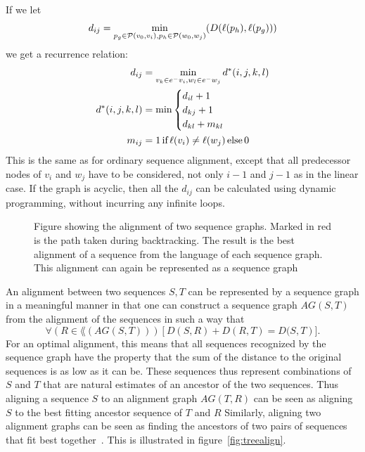 If we let 
\[
  d_{ij} = \min_{p_g \in \paths(v_0, v_i), p_h \in \paths(w_0, w_j)}(D(\slabel(p_h), \slabel(p_g)))
\]  we get a recurrence relation:
\begin{align*}
  d_{ij} &= \min_{v_k \in \preds{v_i}, w_l \in \preds{w_j}} d^*(i, j, k, l)\\
  d^*(i, j, k, l) &= \min \begin{cases}
    d_{il} + 1\\
    d_{kj} + 1\\
    d_{kl} + m_{kl}\\
    \end{cases}    
    \\
    m_{ij} &= 1\, \text{if}\, \slabel(v_i) \neq \slabel(w_j)\, \text{else}\, 0\\
\end{align*}
This is the same as for ordinary sequence alignment, except that all predecessor nodes of $v_i$ and $w_j$ have to be considered, not only $i-1$ and $j-1$ as in the linear case.
If the graph is acyclic, then all the $d_{ij}$ can be calculated using dynamic programming, without incurring any infinite loops.
\begin{figure}
  \begin{tikzpicture}
    
  \end{tikzpicture}
  \caption{
    Figure showing the alignment of two sequence graphs.
    Marked in red is the path taken during backtracking.
    The result is the best alignment of a sequence from the language of each sequence graph.
    This alignment can again be represented as a sequence graph}
    \label{fig:seqgrapha}
\end{figure}

An alignment between two sequences $S, T$ can be represented by a sequence graph in a meaningful manner in that one can construct a sequence graph $AG(S, T)$ from the alignment of the sequences in such a way that 
\[
\forall (R \in \lang(AG(S, T)))\left[D(S, R)+D(R, T) =  D(S, T\right)].
\]
For an optimal alignment, this means that all sequences recognized by the sequence graph have the property that the sum of the distance to the original sequences is as low as it can be.
These sequences thus represent combinations of $S$ and $T$ that are natural estimates of an ancestor of the two sequences.
Thus aligning a sequence $S$ to an alignment graph $AG(T, R)$  can be seen as aligning $S$ to the best fitting ancestor sequence of $T$ and $R$
Similarly, aligning two alignment graphs can be seen as finding the ancestors of two pairs of sequences that fit best together~\cite{treealign, poa2}.
This is illustrated in figure~\ref{fig:treealign}.

